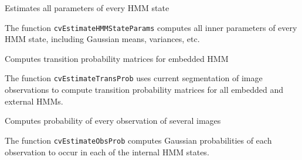 Estimates all parameters of every HMM state


\begin{description}
\end{description}

The function \texttt{cvEstimateHMMStateParams} computes all inner parameters of every HMM state, including Gaussian means, variances, etc.


Computes transition probability matrices for embedded HMM


\begin{description}
\end{description}

The function \texttt{cvEstimateTransProb} uses current segmentation of image observations to compute transition probability matrices for all embedded and external HMMs.


Computes probability of every observation of several images


\begin{description}
\end{description}

The function \texttt{cvEstimateObsProb} computes Gaussian probabilities of each observation to occur in each of the internal HMM states.


